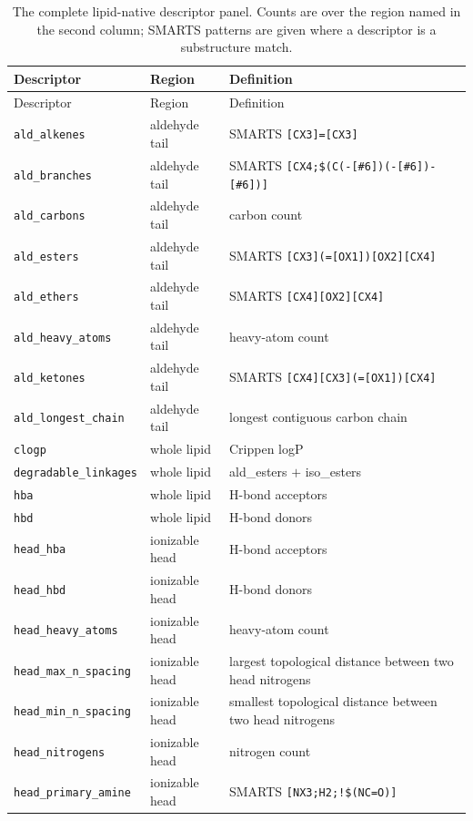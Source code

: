 \documentclass{article}
\begin{document}
\begin{longtable}{@{}p{4.0cm}p{2.6cm}p{6.2cm}@{}}
\caption{The complete lipid-native descriptor panel. Counts are over the region named in the second column; SMARTS patterns are given where a descriptor is a substructure match.}\label{tab:descriptor-dict}\\
\toprule
Descriptor & Region & Definition \\
\midrule
\endfirsthead
\toprule Descriptor & Region & Definition \\ \midrule \endhead
\bottomrule
\endfoot
\texttt{ald\_alkenes} & aldehyde tail & SMARTS \texttt{[CX3]=[CX3]} \\
\texttt{ald\_branches} & aldehyde tail & SMARTS \texttt{[CX4;\$(C(-[\#6])(-[\#6])-[\#6])]} \\
\texttt{ald\_carbons} & aldehyde tail & carbon count \\
\texttt{ald\_esters} & aldehyde tail & SMARTS \texttt{[CX3](=[OX1])[OX2][CX4]} \\
\texttt{ald\_ethers} & aldehyde tail & SMARTS \texttt{[CX4][OX2][CX4]} \\
\texttt{ald\_heavy\_atoms} & aldehyde tail & heavy-atom count \\
\texttt{ald\_ketones} & aldehyde tail & SMARTS \texttt{[CX4][CX3](=[OX1])[CX4]} \\
\texttt{ald\_longest\_chain} & aldehyde tail & longest contiguous carbon chain \\
\texttt{clogp} & whole lipid & Crippen logP \\
\texttt{degradable\_linkages} & whole lipid & ald\_esters $+$ iso\_esters \\
\texttt{hba} & whole lipid & H-bond acceptors \\
\texttt{hbd} & whole lipid & H-bond donors \\
\texttt{head\_hba} & ionizable head & H-bond acceptors \\
\texttt{head\_hbd} & ionizable head & H-bond donors \\
\texttt{head\_heavy\_atoms} & ionizable head & heavy-atom count \\
\texttt{head\_max\_n\_spacing} & ionizable head & largest topological distance between two head nitrogens \\
\texttt{head\_min\_n\_spacing} & ionizable head & smallest topological distance between two head nitrogens \\
\texttt{head\_nitrogens} & ionizable head & nitrogen count \\
\texttt{head\_primary\_amine} & ionizable head & SMARTS \texttt{[NX3;H2;!\$(NC=O)]} \\

\end{longtable}
\end{document}
